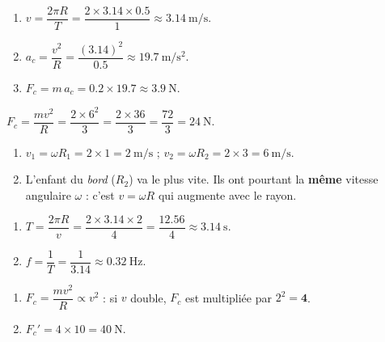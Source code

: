 \documentclass[11pt,a4paper]{article}
\begin{document}

\begin{corrige}
\begin{enumerate}[label=\alph*)]
  \item $v=\dfrac{2\pi R}{T}=\dfrac{2\times\num{3,14}\times\num{0,5}}{1}\approx\qty{3,14}{\metre\per\second}$.
  \item $a_c=\dfrac{v^2}{R}=\dfrac{(\num{3,14})^2}{\num{0,5}}\approx\qty{19,7}{\metre\per\second\squared}$.
  \item $F_c=m\,a_c=\num{0,2}\times\num{19,7}\approx\qty{3,9}{\newton}$.
\end{enumerate}
\end{corrige}

\begin{corrige}
$F_c=\dfrac{mv^2}{R}=\dfrac{2\times 6^2}{3}=\dfrac{2\times36}{3}=\dfrac{72}{3}=\qty{24}{\newton}$.
\end{corrige}

\begin{corrige}
\begin{enumerate}[label=\alph*)]
  \item $v_1=\omega R_1=2\times1=\qty{2}{\metre\per\second}$ ; $v_2=\omega R_2=2\times3=\qty{6}{\metre\per\second}$.
  \item L'enfant du \emph{bord} ($R_2$) va le plus vite. Ils ont pourtant la \textbf{même} vitesse angulaire
        $\omega$ : c'est $v=\omega R$ qui augmente avec le rayon.
\end{enumerate}
\end{corrige}

\begin{corrige}
\begin{enumerate}[label=\alph*)]
  \item $T=\dfrac{2\pi R}{v}=\dfrac{2\times\num{3,14}\times2}{4}=\dfrac{\num{12,56}}{4}\approx\qty{3,14}{\second}$.
  \item $f=\dfrac{1}{T}=\dfrac{1}{\num{3,14}}\approx\qty{0,32}{\hertz}$.
\end{enumerate}
\end{corrige}

\begin{corrige}
\begin{enumerate}[label=\alph*)]
  \item $F_c=\dfrac{mv^2}{R}\propto v^2$ : si $v$ double, $F_c$ est multipliée par $2^2=\mathbf{4}$.
  \item $F_c'=4\times10=\qty{40}{\newton}$.
\end{enumerate}
\end{corrige}
\end{document}
